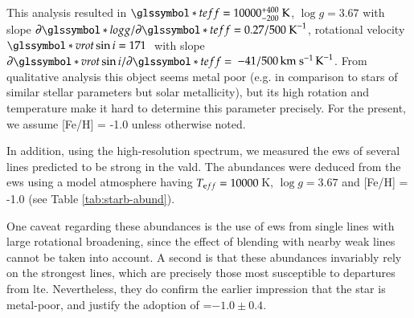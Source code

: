 This analysis resulted in $\teff = 10000^{+ 400}_{-200}~\textrm{K}$, $\log{g} = 3.67$ with slope  $\partial \logg/\partial \teff = 0.27/500~\textrm{K}^{-1}$, rotational velocity $\vrot \sin{i} = 171$\,\kms\ with slope $\partial \vrot \sin{i} / \partial \teff =$ $ -41/500\,\textrm{km}~\textrm{s}^{-1}\,\textrm{K}^{-1}$. From qualitative analysis this object seems metal poor (e.g. in comparison to stars of similar stellar parameters but solar metallicity), but its high rotation and temperature make it hard to determine this parameter precisely. For the present, we assume [Fe/H] = -1.0 unless otherwise noted.

In addition, using the high-resolution spectrum, we measured the \glspl{ew} of several lines predicted to be strong in the \gls{vald}. The abundances were deduced from the \glspl{ew} using a model atmosphere having $T_{\textrm eff} = 10000$\,K, $\log{g}=3.67$ and [Fe/H] = -1.0 (see Table \ref{tab:starb-abund}).

One caveat regarding these abundances is the use of \glspl{ew} from 
single lines with large rotational broadening, since the effect of blending 
with nearby weak lines cannot be taken into account. A second is that these 
abundances invariably rely on the strongest lines, which are precisely those 
most susceptible to departures from \gls{lte}. 
Nevertheless, they do confirm the earlier impression that the star is 
metal-poor, and justify the adoption of \feh=$-1.0 \pm 0.4$.




